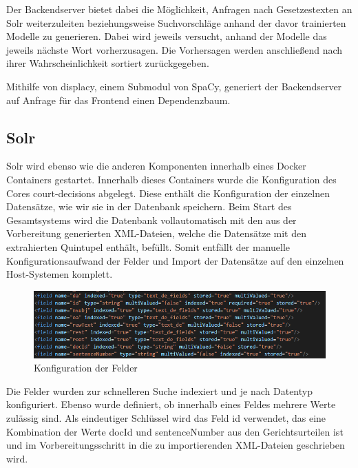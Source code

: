 Der Backendserver bietet dabei die Möglichkeit, Anfragen nach Gesetzestexten an Solr weiterzuleiten beziehungsweise Suchvorschläge anhand der davor trainierten Modelle zu generieren. Dabei wird jeweils versucht, anhand der Modelle das jeweils nächste Wort vorherzusagen. Die Vorhersagen werden anschließend nach ihrer Wahrscheinlichkeit sortiert zurückgegeben.

Mithilfe von displacy, einem Submodul von SpaCy, generiert der Backendserver auf Anfrage für das Frontend einen Dependenzbaum.

\subsection{Solr}

Solr wird ebenso wie die anderen Komponenten innerhalb eines Docker Containers gestartet. Innerhalb dieses Containers wurde die Konfiguration des Cores  \glqq court-decisions\grqq{} abgelegt. Diese enthält die Konfiguration der einzelnen Datensätze, wie wir sie in der Datenbank speichern. Beim Start des Gesamtsystems wird die Datenbank vollautomatisch mit den aus der Vorbereitung generierten XML-Dateien, welche die Datensätze mit den extrahierten Quintupel enthält, befüllt. Somit entfällt der manuelle Konfigurationsaufwand der Felder und Import der Datensätze auf den einzelnen Host-Systemen komplett.

\begin{figure}[H]
 \centering
 \includegraphics[width=\textwidth]{images/SolrSchema.png}
 \caption{Konfiguration der Felder}
 \label{fig:SolrSchema}
\end{figure}

Die Felder wurden zur schnelleren Suche indexiert und je nach Datentyp konfiguriert. Ebenso wurde definiert, ob innerhalb eines Feldes mehrere Werte zulässig sind. Als eindeutiger Schlüssel wird das Feld \glqq id\grqq{} verwendet, das eine Kombination der Werte \glqq docId\grqq{} und \glqq sentenceNumber\grqq{} aus den Gerichtsurteilen ist und im Vorbereitungsschritt in die zu importierenden XML-Dateien geschrieben wird. 

